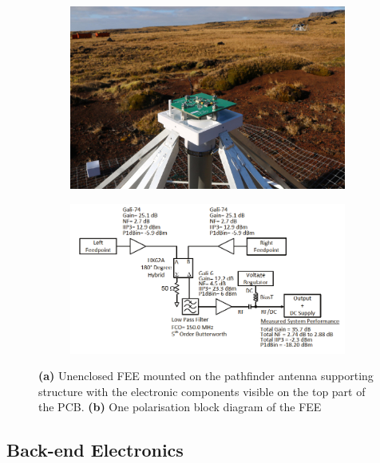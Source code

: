 \begin{figure}
	\centering
	\begin{subfigure}[t]{0.52\textwidth}
		\centering
		\includegraphics[width=\linewidth]{Figures/balun} 
		\caption{} \label{Fig:balun}
	\end{subfigure}
	\hfill
	\begin{subfigure}[t]{0.47\textwidth}
		\centering
		\includegraphics[width=\linewidth]{Figures/Balun_Block.png}
		\caption{} \label{Fig:Balun Schematic}
	\end{subfigure}
	\caption{{\bf (a)} Unenclosed FEE mounted on the pathfinder antenna supporting structure with the electronic components visible on the top part of the PCB. {\bf (b)} One polarisation block diagram of the FEE~\citep{2012PASP..124.1090H}} \label{Fig:fee}
\end{figure}

\subsection{Back-end Electronics}

